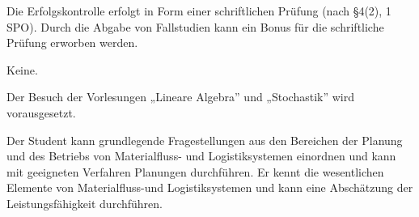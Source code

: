 \begin{course}

\setdoclanguagegerman
{}



\coursehead


\label{cour_5631.dp_997}


\begin{styleenv}
\begin{assessment}
Die Erfolgskontrolle erfolgt in Form einer schriftlichen Prüfung (nach §4(2), 1 SPO). Durch die Abgabe von Fallstudien kann ein Bonus für die schriftliche Prüfung erworben werden.


\end{assessment}

\begin{conditions}Keine.\end{conditions}

\begin{recommendations}Der Besuch der Vorlesungen „Lineare Algebra” und „Stochastik” wird vorausgesetzt.

\end{recommendations}
\end{styleenv}

\begin{learningoutcomes}
Der Student kann grundlegende Fragestellungen aus den Bereichen der Planung und des Betriebs von Materialfluss- und Logistiksystemen einordnen und kann mit geeigneten Verfahren Planungen durchführen. Er kennt die wesentlichen Elemente von Materialfluss-und Logistiksystemen und kann eine Abschätzung der Leistungsfähigkeit durchführen.


\end{learningoutcomes}


\end{course}
